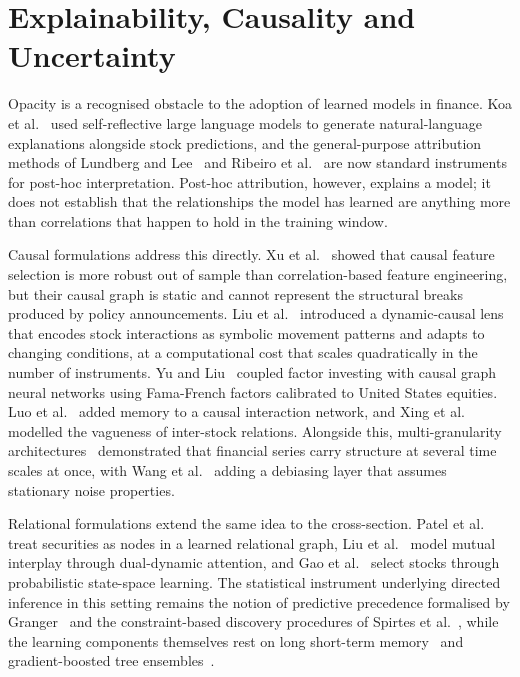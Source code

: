 \section{Explainability, Causality and Uncertainty}

Opacity is a recognised obstacle to the adoption of learned models in finance. Koa et
al.~\cite{koa2024} used self-reflective large language models to generate natural-language
explanations alongside stock predictions, and the general-purpose attribution methods of
Lundberg and Lee~\cite{lundberg2017} and Ribeiro et al.~\cite{ribeiro2016} are now
standard instruments for post-hoc interpretation. Post-hoc attribution, however, explains
a model; it does not establish that the relationships the model has learned are anything
more than correlations that happen to hold in the training window.

Causal formulations address this directly. Xu et al.~\cite{xu2026causal} showed that
causal feature selection is more robust out of sample than correlation-based feature
engineering, but their causal graph is static and cannot represent the structural breaks
produced by policy announcements. Liu et al.~\cite{liu2026dynamic} introduced a
dynamic-causal lens that encodes stock interactions as symbolic movement patterns and
adapts to changing conditions, at a computational cost that scales quadratically in the
number of instruments. Yu and Liu~\cite{yu2025causalseqgnn} coupled factor investing with
causal graph neural networks using Fama-French factors calibrated to United States
equities. Luo et al.~\cite{luo2025magicnet} added memory to a causal interaction network,
and Xing et al.~\cite{xing2024vague} modelled the vagueness of inter-stock relations.
Alongside this, multi-granularity architectures~\cite{zhu2025multigran,wang2025mtmd}
demonstrated that financial series carry structure at several time scales at once, with
Wang et al.~\cite{wang2025mtmd} adding a debiasing layer that assumes stationary noise
properties.

Relational formulations extend the same idea to the cross-section. Patel et
al.~\cite{patel2024hybrid} treat securities as nodes in a learned relational graph, Liu
et al.~\cite{liu2024heterogeneous} model mutual interplay through dual-dynamic attention,
and Gao et al.~\cite{gao2025relational} select stocks through probabilistic state-space
learning. The statistical instrument underlying directed inference in this setting
remains the notion of predictive precedence formalised by
Granger~\cite{granger1969} and the constraint-based discovery procedures of Spirtes et
al.~\cite{spirtes2000}, while the learning components themselves rest on long
short-term memory~\cite{hochreiter1997} and gradient-boosted tree
ensembles~\cite{chen2016xgboost}.

